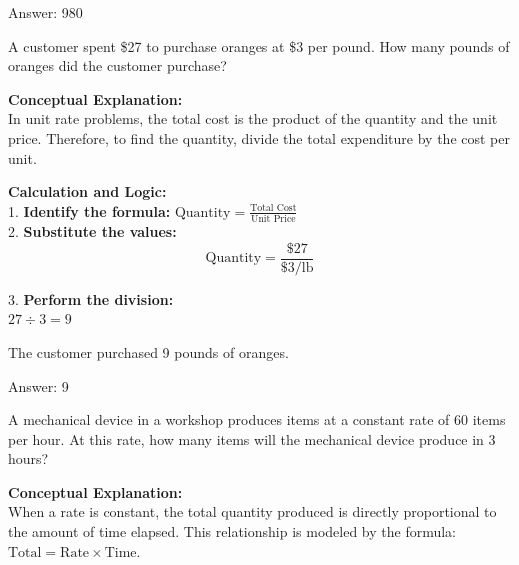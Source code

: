 \documentclass[11pt,paper=a4,answers]{exam}
\begin{document}
\begin{questions}
\begin{solution}
\vspace{30pt}

Answer: \colorbox{yellow!100}{980}
\end{solution}

\vspace{60pt}

\question
A customer spent \$27 to purchase oranges at \$3 per pound. How many pounds of oranges did the customer purchase?

\begin{solution}
\textbf{Conceptual Explanation:} \\
In unit rate problems, the total cost is the product of the quantity and the unit price. Therefore, to find the quantity, divide the total expenditure by the cost per unit.

\vspace{30pt}

\textbf{Calculation and Logic:} \\
1. \textbf{Identify the formula:} $\text{Quantity} = \frac{\text{Total Cost}}{\text{Unit Price}}$ \\
2. \textbf{Substitute the values:} \\
\[ \text{Quantity} = \frac{\$27}{\$3/\text{lb}} \]

\vspace{15pt}

3. \textbf{Perform the division:} \\
$27 \div 3 = 9$

\vspace{10pt}

The customer purchased 9 pounds of oranges.

\vspace{30pt}

Answer: \colorbox{yellow!100}{9}
\end{solution}

\question
A mechanical device in a workshop produces items at a constant rate of 60 items per hour. At this rate, how many items will the mechanical device produce in 3 hours?

\begin{solution}
\textbf{Conceptual Explanation:} \\
When a rate is constant, the total quantity produced is directly proportional to the amount of time elapsed. This relationship is modeled by the formula: $\text{Total} = \text{Rate} \times \text{Time}$.


\end{solution}
\end{questions}
\end{document}
